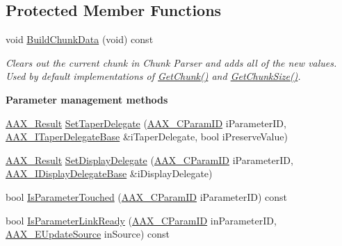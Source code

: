 \subsection*{Protected Member Functions}
\begin{DoxyCompactItemize}
\item 
void \mbox{\hyperlink{a01481_a0fd3465f1a37beb0c9d8be5e33a5cf58}{Build\+Chunk\+Data}} (void) const
\begin{DoxyCompactList}\small\item\em Clears out the current chunk in Chunk Parser and adds all of the new values. Used by default implementations of \mbox{\hyperlink{a01481_aeddfa6e0b92f9373836ae41491114c4d}{Get\+Chunk()}} and \mbox{\hyperlink{a01481_aade2d4ba2fcb8c302917caf4bfb0f8cf}{Get\+Chunk\+Size()}}. \end{DoxyCompactList}\end{DoxyCompactItemize}
\begin{Indent}\textbf{ Parameter management methods}\par
\begin{DoxyCompactItemize}
\item 
\mbox{\hyperlink{a00392_a4d8f69a697df7f70c3a8e9b8ee130d2f}{A\+A\+X\+\_\+\+Result}} \mbox{\hyperlink{a01481_a363be3503435a8619f6cba787ee678ac}{Set\+Taper\+Delegate}} (\mbox{\hyperlink{a00392_a1440c756fe5cb158b78193b2fc1780d1}{A\+A\+X\+\_\+\+C\+Param\+ID}} i\+Parameter\+ID, \mbox{\hyperlink{a01877}{A\+A\+X\+\_\+\+I\+Taper\+Delegate\+Base}} \&i\+Taper\+Delegate, bool i\+Preserve\+Value)
\item 
\mbox{\hyperlink{a00392_a4d8f69a697df7f70c3a8e9b8ee130d2f}{A\+A\+X\+\_\+\+Result}} \mbox{\hyperlink{a01481_ad4aeb081bffb2414182251d4e41c1ed2}{Set\+Display\+Delegate}} (\mbox{\hyperlink{a00392_a1440c756fe5cb158b78193b2fc1780d1}{A\+A\+X\+\_\+\+C\+Param\+ID}} i\+Parameter\+ID, \mbox{\hyperlink{a01797}{A\+A\+X\+\_\+\+I\+Display\+Delegate\+Base}} \&i\+Display\+Delegate)
\item 
bool \mbox{\hyperlink{a01481_a7ee10904c6933cbf82b6050044fa15eb}{Is\+Parameter\+Touched}} (\mbox{\hyperlink{a00392_a1440c756fe5cb158b78193b2fc1780d1}{A\+A\+X\+\_\+\+C\+Param\+ID}} i\+Parameter\+ID) const
\item 
bool \mbox{\hyperlink{a01481_adf4d2d6060bf3e13619838cea8b59865}{Is\+Parameter\+Link\+Ready}} (\mbox{\hyperlink{a00392_a1440c756fe5cb158b78193b2fc1780d1}{A\+A\+X\+\_\+\+C\+Param\+ID}} in\+Parameter\+ID, \mbox{\hyperlink{a00491_a30be0398faf20c6b121239eb9399f3f7}{A\+A\+X\+\_\+\+E\+Update\+Source}} in\+Source) const
\end{DoxyCompactItemize}
\end{Indent}
